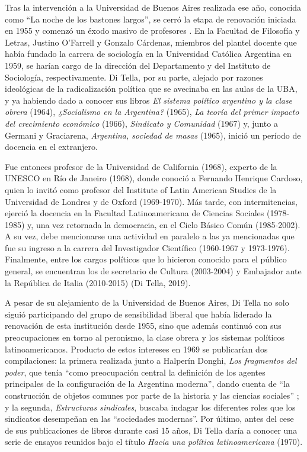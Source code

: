Tras la intervención a la Universidad de Buenos Aires realizada ese año, conocida como \enquote{La noche de los bastones largos}, se cerró la etapa de renovación iniciada en 1955 y comenzó un éxodo masivo de profesores \parencite{1536-BUCHBINDER2010}. En la Facultad de Filosofía y Letras, Justino O'Farrell y Gonzalo Cárdenas, miembros del plantel docente que había fundado la carrera de sociología en la Universidad Católica Argentina en 1959, se harían cargo de la dirección del Departamento y del Instituto de Sociología, respectivamente. Di Tella, por su parte, alejado por razones ideológicas de la radicalización política que se avecinaba en las aulas de la UBA, y ya habiendo dado a conocer sus libros \emph{El sistema político argentino y la clase obrera} (1964), \emph{¿Socialismo en la Argentina?} (1965), \emph{La teoría del primer impacto del crecimiento económico} (1966), \emph{Sindicato y Comunidad} (1967) y, junto a Germani y Graciarena, \emph{Argentina, sociedad de masas} (1965), inició un período de docencia en el extranjero.

Fue entonces profesor de la Universidad de California (1968), experto de la UNESCO en Río de Janeiro (1968), donde conoció a Fernando Henrique Cardoso, quien lo invitó como profesor del Institute of Latin American Studies de la Universidad de Londres y de Oxford (1969-1970). Más tarde, con intermitencias, ejerció la docencia en la Facultad Latinoamericana de Ciencias Sociales (1978-1985) y, una vez retornada la democracia, en el Ciclo Básico Común (1985-2002). A su vez, debe mencionarse una actividad en paralelo a las ya mencionadas que fue su ingreso a la carrera del Investigador Científico (1960-1967 y 1973-1976). Finalmente, entre los cargos políticos que lo hicieron conocido para el público general, se encuentran los de secretario de Cultura (2003-2004) y Embajador ante la República de Italia (2010-2015) (Di Tella, 2019).

A pesar de su alejamiento de la Universidad de Buenos Aires, Di Tella no solo siguió participando del grupo de sensibilidad liberal que había liderado la renovación de esta institución desde 1955, sino que además continuó con sus preocupaciones en torno al peronismo, la clase obrera y los sistemas políticos latinoamericanos. Producto de estos intereses en 1969 se publicarían dos compilaciones: la primera realizada junto a Halperín Donghi, \emph{Los fragmentos del poder}, que tenía \enquote{como preocupación central la definición de los agentes principales de la configuración de la Argentina moderna}, dando cuenta de \enquote{la construcción de objetos comunes por parte de la historia y las ciencias sociales} \parencite[122]{1511-SARLO2001}; y la segunda, \emph{Estructuras sindicales}, buscaba indagar los diferentes roles que los sindicatos desempeñan en las \enquote{sociedades modernas}. Por último, antes del cese de sus publicaciones de libros durante casi 15 años, Di Tella daría a conocer una serie de ensayos reunidos bajo el título \emph{Hacia una política latinoamericana} (1970).

